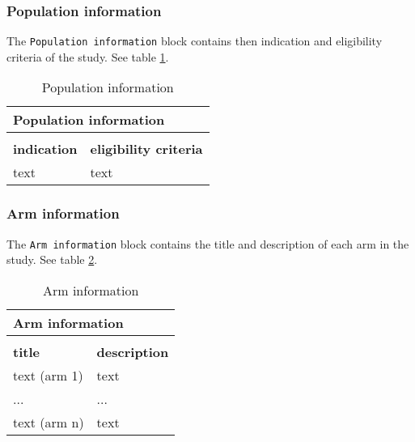 \documentclass[a4paper,10pt]{article}
\begin{document}
\subsubsection*{Population information}
The \texttt{Population information} block contains then indication and eligibility criteria of the study. See table \ref{table:Population information}.
\begin{table}[h]
  \centering
  \caption{Population information}
  \label{table:Population information}
  \begin{tabular}{|l|l|}
    \hline
    \multicolumn{2}{|l|}{\textbf{Population information}} \\ \hline
    \multicolumn{2}{|l|}{}                                \\ \hline
    \textbf{indication} & \textbf{eligibility criteria}   \\ \hline
    text & text                                           \\ \hline
  \end{tabular}
\end{table}

\subsubsection*{Arm information}
The \texttt{Arm information} block contains the title and description of each arm in the study. See table \ref{table:Arm information}.
\begin{table}[h]
  \centering
  \caption{Arm information}
  \label{table:Arm information}
  \begin{tabular}{|l|l|}
    \hline
    \multicolumn{2}{|l|}{\textbf{Arm information}}  \\ \hline
    \multicolumn{2}{|l|}{}                          \\ \hline
    \textbf{title} & \textbf{description}           \\ \hline
    text (arm 1)& text                              \\ \hline
    ... & ...                                       \\ \hline
    text (arm n)& text                              \\ \hline
  \end{tabular}
\end{table}
\end{document}
